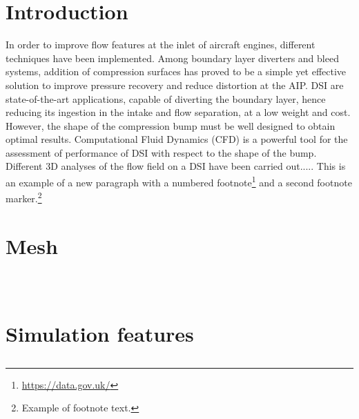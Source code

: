 \documentclass[12pt,a4paper]{article}
\newcommand{\subsubsubsection}[1]{%
  \vspace{\baselineskip}%
  \noindent\textbf{#1\\}\quad%
}
\begin{document}
\vspace{0.15cm}

\section{Introduction}
 In order to improve flow features at the inlet of aircraft engines, different techniques have been implemented. Among boundary layer diverters and bleed systems, addition of compression surfaces has proved to be a simple yet effective solution to improve pressure recovery and reduce distortion at the AIP. DSI are state-of-the-art applications, capable of diverting the boundary layer, hence reducing its ingestion in the intake and flow separation, at a low weight and cost. However, the shape of the compression bump must be well designed to obtain optimal results. Computational Fluid Dynamics (CFD) is a powerful tool for the assessment of performance of DSI with respect to the shape of the bump. Different 3D analyses of the flow field on a DSI have been carried out.....
This is an example of a new paragraph with a numbered footnote\footnote{\url{https://data.gov.uk/}} and a second footnote marker.\footnote{Example of footnote text.}

\section{Mesh}\label{sec2}

\subsection{}

\subsection{}\label{subsec1}

\subsubsection{}\label{subsubsec1}

\subsubsubsection{}

\vspace{-1.5cm}
\section{Simulation features}\label{sec3}

\subsection{}\label{subsec2}
\end{document}
